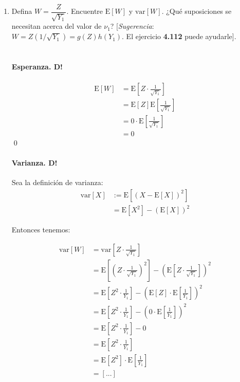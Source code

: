 \documentclass[8pt]{article}
\begin{document}
\begin{enumerate}
    \item Defina $W = \dfrac{Z}{\sqrt{Y_1}}$. Encuentre $\text{E}[W]$ y $\text{var}[W]$. ¿Qué suposiciones se necesitan acerca del valor de $\nu_1$? [\textit{Sugerencia}: $W = Z(1/\sqrt{Y_1}) = g(Z)h(Y_1)$. El ejercicio \textbf{4.112} puede ayudarle]. \\\\
    
    \paragraph*{Esperanza. D!}
    \begin{align*}
        \text{E}[W] &= \text{E}\left[Z \cdot \frac{1}{\sqrt{Y_1}}\right] \\
        &= \text{E}\left[Z\right]\text{E}\left[\frac{1}{\sqrt{Y_1}}\right] \\
        &= 0 \cdot \text{E}\left[\frac{1}{\sqrt{Y_1}}\right] \\
        &= 0
    \end{align*}\qed

    \paragraph*{Varianza. D!} Sea la definición de varianza:
    \begin{align*}
        \text{var}[X] &:= \text{E}\left[\left(X - \text{E}[X]\right)^2\right] \\
        &= \text{E}\left[X^2\right] - \left(\text{E}\left[X\right]\right)^2
    \end{align*}

    Entonces tenemos:

    \begin{align*}
        \text{var}[W] &= \text{var}\left[Z \cdot \frac{1}{\sqrt{Y_1}}\right] \\
        &= \text{E}\left[\left(Z \cdot \frac{1}{\sqrt{Y_1}}\right)^2\right] - \left(\text{E}\left[Z \cdot \frac{1}{\sqrt{Y_1}}\right]\right)^2 \\
        &= \text{E}\left[Z^2 \cdot \frac{1}{Y_1}\right] - \left(\text{E}\left[Z\right] \cdot \text{E}\left[\frac{1}{Y_1}\right]\right)^2 \\
        &= \text{E}\left[Z^2 \cdot \frac{1}{Y_1}\right] - \left(0 \cdot \text{E}\left[\frac{1}{Y_1}\right]\right)^2 \\
        &= \text{E}\left[Z^2 \cdot \frac{1}{Y_1}\right] - 0 \\
        &= \text{E}\left[Z^2 \cdot \frac{1}{Y_1}\right] \\
        &= \text{E}\left[Z^2\right] \cdot \text{E}\left[\frac{1}{Y_1}\right] \\
        &= [...]
    \end{align*}


\end{enumerate}
\end{document}
